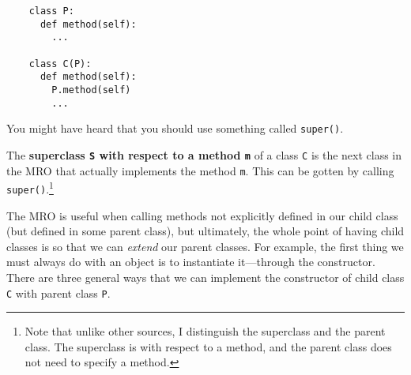   \begin{lstlisting}
    class P: 
      def method(self): 
        ...

    class C(P): 
      def method(self): 
        P.method(self) 
        ...
  \end{lstlisting} 

  You might have heard that you should use something called \texttt{super()}. 

  \begin{definition}[Superclass] 
    The \textbf{superclass \texttt{S} with respect to a method \texttt{m}} of a class \texttt{C} is the next class in the MRO that actually implements the method \texttt{m}. This can be gotten by calling \texttt{super()}.\footnote{Note that unlike other sources, I distinguish the superclass and the parent class. The superclass is with respect to a method, and the parent class does not need to specify a method.}
  \end{definition} 

  The MRO is useful when calling methods not explicitly defined in our child class (but defined in some parent class), but ultimately, the whole point of having child classes is so that we can \textit{extend} our parent classes. For example, the first thing we must always do with an object is to instantiate it---through the constructor. There are three general ways that we can implement the constructor of child class \texttt{C} with parent class \texttt{P}. 

